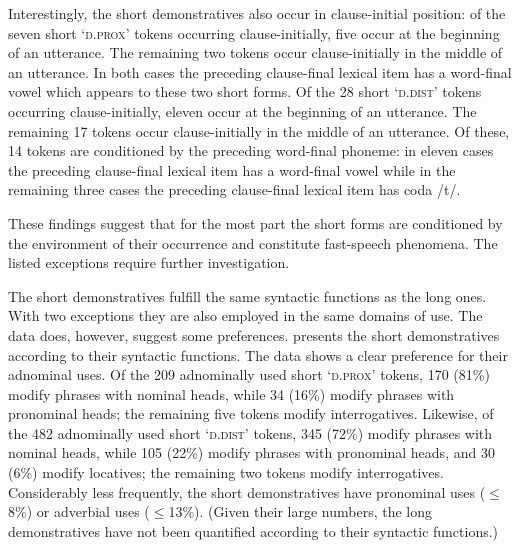Interestingly, the short demonstratives also occur in clause-initial position: of the seven short  ‘\textsc{d.prox}’ tokens occurring clause-initially, five occur at the beginning of an utterance. The remaining two tokens occur clause-initially in the middle of an utterance. In both cases the preceding clause-final lexical item has a word-final vowel which appears to  these two short forms. Of the 28 short  ‘\textsc{d.dist}’ tokens occurring clause-initially, eleven occur at the beginning of an utterance. The remaining 17 tokens occur clause-initially in the middle of an utterance. Of these, 14 tokens are conditioned by the preceding word-final phoneme: in eleven cases the preceding clause-final lexical item has a word-final vowel while in the remaining three cases the preceding clause-final lexical item has coda /t/.



These findings suggest that for the most part the short  forms are conditioned by the environment of their occurrence and constitute fast-speech phenomena. The listed exceptions require further investigation.



The short demonstratives fulfill the same syntactic functions as the long ones. With two exceptions they are also employed in the same domains of use. The data does, however, suggest some preferences.  presents the short demonstratives according to their syntactic functions. The data shows a clear preference for their adnominal uses. Of the 209 adnominally used short  ‘\textsc{d.prox}’ tokens, 170 (81\%) modify  phrases with nominal heads, while 34 (16\%) modify  phrases with pronominal heads; the remaining five tokens modify interrogatives. Likewise, of the 482 adnominally used short  ‘\textsc{d.dist}’ tokens, 345 (72\%) modify  phrases with nominal heads, while 105 (22\%) modify  phrases with pronominal heads, and 30 (6\%) modify locatives; the remaining two tokens modify interrogatives. Considerably less frequently, the short demonstratives have pronominal uses (${\leq}$8\%) or adverbial uses (${\leq}$13\%). (Given their large numbers, the long demonstratives have not been quantified according to their syntactic functions.)



